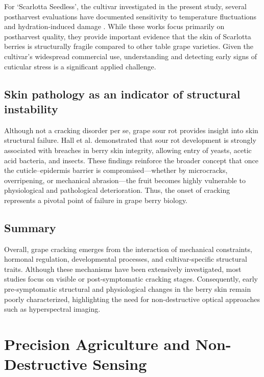 \medskip
\noindent
For ‘Scarlotta Seedless’, the cultivar investigated in the present study, several postharvest evaluations
have documented sensitivity to temperature fluctuations and hydration-induced damage
\cite{OWOYEMI2024113013,Hamie2022SugranineteenMaturation}. While these works focus primarily on postharvest quality, they provide
important evidence that the skin of Scarlotta berries is structurally fragile compared to other table grape
varieties. Given the cultivar’s widespread commercial use, understanding and detecting early signs of
cuticular stress is a significant applied challenge.

\subsection{Skin pathology as an indicator of structural instability}

\noindent
Although not a cracking disorder per se, grape sour rot provides insight into skin structural failure.
Hall et al. \cite{Hall2018} demonstrated that sour rot development is strongly associated with breaches
in berry skin integrity, allowing entry of yeasts, acetic acid bacteria, and insects. These findings reinforce
the broader concept that once the cuticle–epidermis barrier is compromised—whether by microcracks,
overripening, or mechanical abrasion—the fruit becomes highly vulnerable to physiological and
pathological deterioration. Thus, the onset of cracking represents a pivotal point of failure in grape
berry biology.

\subsection{Summary}

\noindent
Overall, grape cracking emerges from the interaction of mechanical constraints,
hormonal regulation, developmental processes, and cultivar-specific structural traits.
Although these mechanisms have been extensively investigated, most studies focus on
visible or post-symptomatic cracking stages. Consequently, early pre-symptomatic
structural and physiological changes in the berry skin remain poorly characterized,
highlighting the need for non-destructive optical approaches such as hyperspectral
imaging.




\section{Precision Agriculture and Non-Destructive Sensing}
\label{sec:precision_agriculture}

